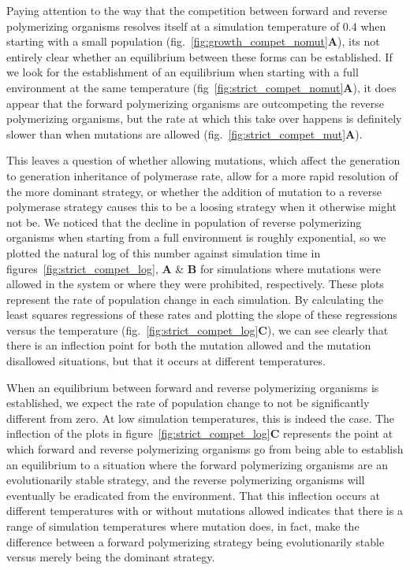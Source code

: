 Paying attention to the way that the competition between forward and reverse polymerizing organisms resolves itself at a simulation temperature of 0.4 when starting with a small population (fig.~\ref{fig:growth_compet_nomut}\textbf{A}), its not entirely clear whether an equilibrium between these forms can be established. If we look for the establishment of an equilibrium when starting with a full environment at the same temperature (fig~\ref{fig:strict_compet_nomut}\textbf{A}), it does appear that the forward polymerizing organisms are outcompeting the reverse polymerizing organisms, but the rate at which this take over happens is definitely slower than when mutations are allowed (fig.~\ref{fig:strict_compet_mut}\textbf{A}).

This leaves a question of whether allowing mutations, which affect the generation to generation inheritance of polymerase rate, allow for a more rapid resolution of the more dominant strategy, or whether the addition of mutation to a reverse polymerase strategy causes this to be a loosing strategy when it otherwise might not be. We noticed that the decline in population of reverse polymerizing organisms when starting from a full environment is roughly exponential, so we plotted the natural log of this number against simulation time in figures~\ref{fig:strict_compet_log}, \textbf{A} \& \textbf{B} for simulations where mutations were allowed in the system or where they were prohibited, respectively. These plots represent the rate of population change in each simulation. By calculating the least squares regressions of these rates and plotting the slope of these regressions versus the temperature (fig.~\ref{fig:strict_compet_log}\textbf{C}), we can see clearly that there is an inflection point for both the mutation allowed and the mutation disallowed situations, but that it occurs at different temperatures.

When an equilibrium between forward and reverse polymerizing organisms is established, we expect the rate of population change to not be significantly different from zero. At low simulation temperatures, this is indeed the case. The inflection of the plots in figure~\ref{fig:strict_compet_log}\textbf{C} represents the point at which forward and reverse polymerizing organisms go from being able to establish an equilibrium to a situation where the forward polymerizing organisms are an evolutionarily stable strategy, and the reverse polymerizing organisms will eventually be eradicated from the environment. That this inflection occurs at different temperatures with or without mutations allowed indicates that there is a range of simulation temperatures where mutation does, in fact, make the difference between a forward polymerizing strategy being evolutionarily stable versus merely being the dominant strategy.


